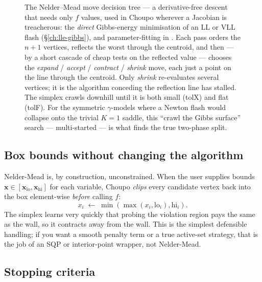 \documentclass[11pt,a4paper]{article}
\newcommand{\xv}{\mathbf{x}}
\begin{document}
\begin{figure}[h]
\caption{The Nelder--Mead move decision tree --- a derivative-free
descent that needs only $f$ values, used in Choupo wherever a Jacobian
is treacherous: the \emph{direct} Gibbs-energy minimisation of an LL or
VLL flash (\S\ref{ch:lle-gibbs}), and parameter-fitting in
.  Each pass orders the $n{+}1$ vertices,
reflects the worst through the centroid, and then --- by a short
cascade of cheap tests on the reflected value --- chooses the
\emph{expand} / \emph{accept} / \emph{contract} / \emph{shrink} move,
each just a point on the line through the centroid.  Only \emph{shrink}
re-evaluates several vertices; it is the algorithm conceding the
reflection line has stalled.  The simplex crawls downhill until it is
both small (tolX) and flat (tolF).  For the symmetric $\gamma$-models
where a Newton flash would collapse onto the trivial $K=1$ saddle, this
``crawl the Gibbs surface'' search --- multi-started --- is what finds
the true two-phase split.}
\label{fig:nelder-mead-tree}
\end{figure}

\subsection*{Box bounds without changing the algorithm}

Nelder-Mead is, by construction, unconstrained.  When the user supplies
bounds $\xv \in [\mathbf{x}_{\mathrm{lo}}, \mathbf{x}_{\mathrm{hi}}]$ for each variable, Choupo \emph{clips}
every candidate vertex back into the box element-wise \emph{before}
calling $f$:
\[
    x_i \;\leftarrow\; \min(\max(x_i, \mathrm{lo}_i), \mathrm{hi}_i).
\]
The simplex learns very quickly that probing the violation region pays
the same as the wall, so it contracts away from the wall.  This is the
simplest defensible handling; if you want a smooth penalty term or a
true active-set strategy, that is the job of an SQP or interior-point
wrapper, not Nelder-Mead.

\subsection*{Stopping criteria}
\end{document}
